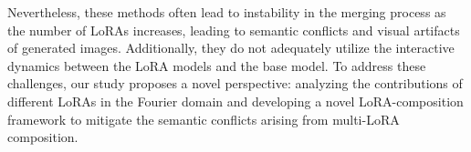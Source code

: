 Nevertheless, these methods often lead to instability in the merging process as the number of LoRAs increases, leading to semantic conflicts and visual artifacts of generated images. Additionally, they do not adequately utilize the interactive dynamics between the LoRA models and the base model. To address these challenges, our study proposes a novel perspective: analyzing the contributions of different LoRAs in the Fourier domain and developing a novel LoRA-composition framework to mitigate the semantic conflicts arising from multi-LoRA composition.

